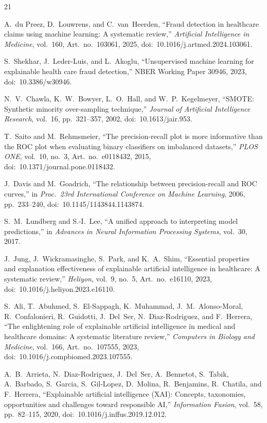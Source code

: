 \begin{thebibliography}{21}

A.~du Preez, D.~Louwrens, and C.~van~Heerden,
``Fraud detection in healthcare claims using machine learning: A systematic review,''
\textit{Artificial Intelligence in Medicine}, vol.~160, Art.~no.~103061, 2025,
doi:~10.1016/j.artmed.2024.103061.

S.~Shekhar, J.~Leder-Luis, and L.~Akoglu,
``Unsupervised machine learning for explainable health care fraud detection,''
NBER Working Paper 30946, 2023,
doi:~10.3386/w30946.

N.~V.~Chawla, K.~W.~Bowyer, L.~O.~Hall, and W.~P.~Kegelmeyer,
``SMOTE: Synthetic minority over-sampling technique,''
\textit{Journal of Artificial Intelligence Research}, vol.~16, pp.~321--357, 2002,
doi:~10.1613/jair.953.

T.~Saito and M.~Rehmsmeier,
``The precision-recall plot is more informative than the ROC plot when evaluating binary classifiers on imbalanced datasets,''
\textit{PLOS ONE}, vol.~10, no.~3, Art.~no.~e0118432, 2015,
doi:~10.1371/journal.pone.0118432.

J.~Davis and M.~Goadrich,
``The relationship between precision-recall and ROC curves,''
in \textit{Proc.\ 23rd International Conference on Machine Learning}, 2006, pp.~233--240,
doi:~10.1145/1143844.1143874.

S.~M.~Lundberg and S.-I.~Lee,
``A unified approach to interpreting model predictions,''
in \textit{Advances in Neural Information Processing Systems}, vol.~30, 2017.

J.~Jung, J.~Wickramasinghe, S.~Park, and K.~A.~Shim,
``Essential properties and explanation effectiveness of explainable artificial intelligence in healthcare: A systematic review,''
\textit{Heliyon}, vol.~9, no.~5, Art.~no.~e16110, 2023,
doi:~10.1016/j.heliyon.2023.e16110.

S.~Ali, T.~Abuhmed, S.~El-Sappagh, K.~Muhammad, J.~M.~Alonso-Moral, R.~Confalonieri, R.~Guidotti, J.~Del~Ser, N.~Diaz-Rodriguez, and F.~Herrera,
``The enlightening role of explainable artificial intelligence in medical and healthcare domains: A systematic literature review,''
\textit{Computers in Biology and Medicine}, vol.~166, Art.~no.~107555, 2023,
doi:~10.1016/j.compbiomed.2023.107555.

A.~B.~Arrieta, N.~Diaz-Rodriguez, J.~Del~Ser, A.~Bennetot, S.~Tabik, A.~Barbado, S.~Garcia, S.~Gil-Lopez, D.~Molina, R.~Benjamins, R.~Chatila, and F.~Herrera,
``Explainable artificial intelligence (XAI): Concepts, taxonomies, opportunities and challenges toward responsible AI,''
\textit{Information Fusion}, vol.~58, pp.~82--115, 2020,
doi:~10.1016/j.inffus.2019.12.012.


\end{thebibliography}
